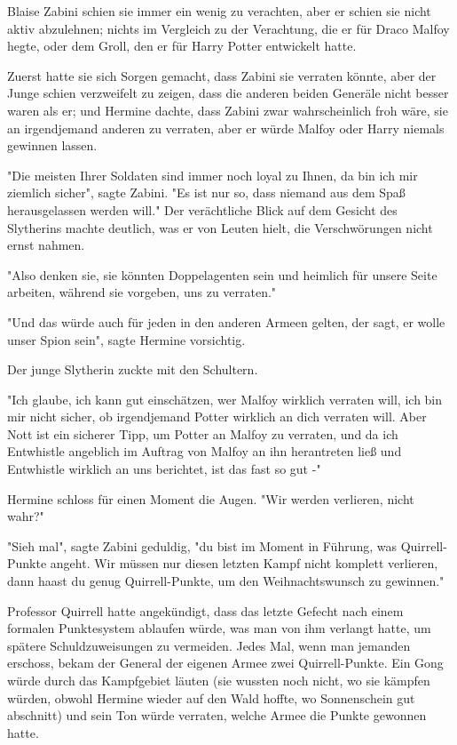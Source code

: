 {Blaise Zabini schien sie immer ein wenig zu verachten, aber er schien sie nicht aktiv abzulehnen; nichts im Vergleich zu der Verachtung, die er für Draco Malfoy hegte, oder dem Groll, den er für Harry Potter entwickelt hatte.

Zuerst hatte sie sich Sorgen gemacht, dass Zabini sie verraten könnte, aber der Junge schien verzweifelt zu zeigen, dass die anderen beiden Generäle nicht besser waren als er; und Hermine dachte, dass Zabini zwar wahrscheinlich froh wäre, sie an irgendjemand anderen zu verraten, aber er würde Malfoy oder Harry niemals gewinnen lassen.

"Die meisten Ihrer Soldaten sind immer noch loyal zu Ihnen, da bin ich mir ziemlich sicher", sagte Zabini. "Es ist nur so, dass niemand aus dem Spaß herausgelassen werden will." Der verächtliche Blick auf dem Gesicht des Slytherins machte deutlich, was er von Leuten hielt, die Verschwörungen nicht ernst nahmen.

"Also denken sie, sie könnten Doppelagenten sein und heimlich für unsere Seite arbeiten, während sie vorgeben, uns zu verraten."

"Und das würde auch für jeden in den anderen Armeen gelten, der sagt, er wolle unser Spion sein", sagte Hermine vorsichtig.

Der junge Slytherin zuckte mit den Schultern.

"Ich glaube, ich kann gut einschätzen, wer Malfoy wirklich verraten will, ich bin mir nicht sicher, ob irgendjemand Potter wirklich an dich verraten will. Aber Nott ist ein sicherer Tipp, um Potter an Malfoy zu verraten, und da ich Entwhistle angeblich im Auftrag von Malfoy an ihn herantreten ließ und Entwhistle wirklich an uns berichtet, ist das fast so gut -"

Hermine schloss für einen Moment die Augen. "Wir werden verlieren, nicht wahr?"

"Sieh mal", sagte Zabini geduldig, "du bist im Moment in Führung, was Quirrell-Punkte angeht. Wir müssen nur diesen letzten Kampf nicht komplett verlieren, dann haast du genug Quirrell-Punkte, um den Weihnachtswunsch zu gewinnen."

Professor Quirrell hatte angekündigt, dass das letzte Gefecht nach einem formalen Punktesystem ablaufen würde, was man von ihm verlangt hatte, um spätere Schuldzuweisungen zu vermeiden. Jedes Mal, wenn man jemanden erschoss, bekam der General der eigenen Armee zwei Quirrell-Punkte. Ein Gong würde durch das Kampfgebiet läuten (sie wussten noch nicht, wo sie kämpfen würden, obwohl Hermine wieder auf den Wald hoffte, wo Sonnenschein gut abschnitt) und sein Ton würde verraten, welche Armee die Punkte gewonnen hatte.

}
